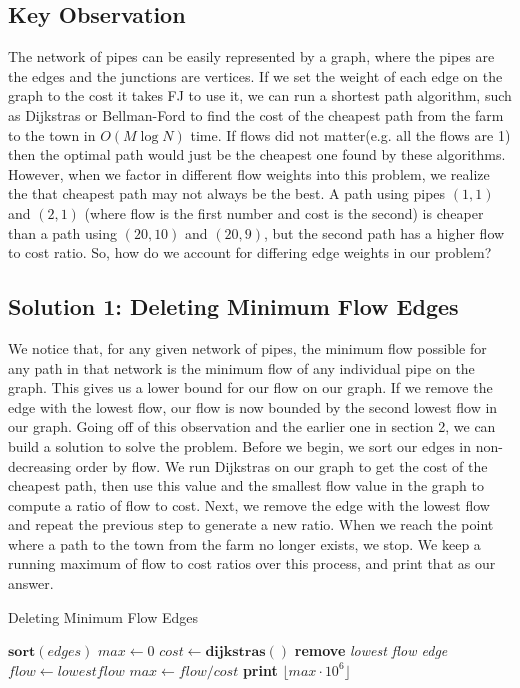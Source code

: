 \documentclass{article}
\begin{document}
\subsection{Key Observation}
    \hspace*{1em} \quad The network of pipes can be easily represented by a graph, where the pipes are the edges and the junctions are vertices. If we set the weight of each edge on the graph to the cost it takes FJ to use it, we can run a shortest path algorithm, such as Dijkstras or Bellman-Ford to find the cost of the cheapest path from the farm to the town in $O(M \log N)$ time. If flows did not matter(e.g. all the flows are 1) then the optimal path would just be the cheapest one found by these algorithms. However, when we factor in different flow weights into this problem, we realize the that cheapest path may not always be the best. A path using pipes $(1, 1)$ and $(2, 1)$ (where flow is the first number and cost is the second) is cheaper than a path using $(20, 10)$ and $(20, 9)$, but the second path has a higher flow to cost ratio. So, how do we account for differing edge weights in our problem?
    
\subsection{Solution 1: Deleting Minimum Flow Edges}
    \hspace*{1em} \quad We notice that, for any given network of pipes, the minimum flow possible for any path in that network is the minimum flow of any individual pipe on the graph. This gives us a lower bound for our flow on our graph. If we remove the edge with the lowest flow, our flow is now bounded by the second lowest flow in our graph. \newline
    \hspace*{1em} \quad Going off of this observation and the earlier one in section 2, we can build a solution to solve the problem. Before we begin, we sort our edges in non-decreasing order by flow. We run Dijkstras on our graph to get the cost of the cheapest path, then use this value and the smallest flow value in the graph to compute a ratio of flow to cost. Next, we remove the edge with the lowest flow and repeat the previous step to generate a new ratio. When we reach the point where a path to the town from the farm no longer exists, we stop. We keep a running maximum of flow to cost ratios over this process, and print that as our answer.
    
    \begin{algorithm}
        \caption{Deleting Minimum Flow Edges}        \begin{algorithmic}[1]
        \State $\textbf{sort}(edges)$
        \State $max \gets 0$
            \State $cost \gets \textbf{dijkstras}()$
            \State \textbf{remove} \textit{lowest flow edge}
            \State $flow \gets lowest flow$
                \State $max \gets flow/cost$
            \EndIf
        \EndWhile
        \State \textbf{print} \textit{$\lfloor max \cdot 10^6 \rfloor$}
        \end{algorithmic}
    \end{algorithm}
    
\end{document}
